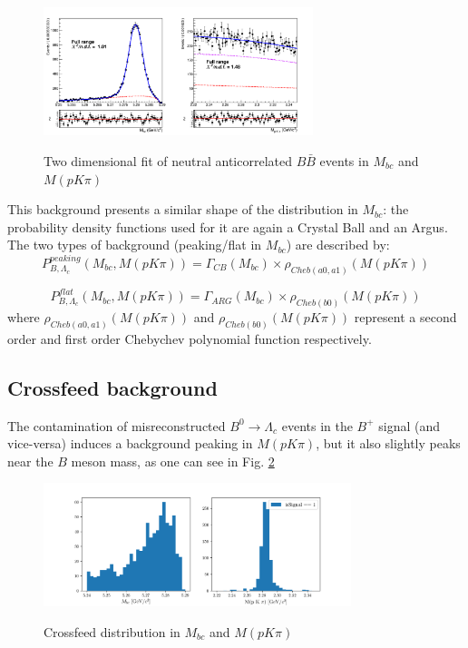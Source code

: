 \begin{figure}
\centering
{\includegraphics[width=0.7\textwidth]{04-SimultaneousFit/figs/stream01235_neutral_anticorrLambdaC_Generic_2DFit.png}}
\caption{Two dimensional fit of neutral anticorrelated $B\bar{B}$  events in $M_{bc}$  and $M(p K \pi)$ }
\label{fig:stream01235_neutral_anticorrLambdaC_Generic_2DFit}
\end{figure}


\newpage
This background presents a 
similar shape of the distribution in $M_{bc}$: the probability
density functions used for it are again a  Crystal Ball and an Argus. \\
The two types of background (peaking/flat in $M_{bc}$) are described by:
\begin{equation}
P^{peaking}_{B,\Lambda_c}(M_{bc}, M(p K \pi)) = \Gamma_{CB}(M_{bc})  \times \rho_{Cheb(a0,a 1)}(M(p K \pi))
\end{equation}

\begin{equation}
P^{flat}_{B,\Lambda_c}(M_{bc}, M(p K \pi)) =  \Gamma_{ARG}(M_{bc}) \times \rho_{Cheb(b0)}(M(p K \pi))
\end{equation}
\newline
where $\rho_{Cheb(a0,a 1)}(M(p K \pi))$ and $\rho_{Cheb(b0)}(M(p K \pi))$  represent a second order and first order Chebychev polynomial function respectively.

\subsection{Crossfeed background}
The contamination of misreconstructed $B^0 \rightarrow \Lambda_c$ events in the $B^+$ signal (and vice-versa) induces a background  peaking in $M(p K \pi)$, but it also slightly peaks near the $B$ meson mass, as one can see in Fig. \ref{fig:chargedBcorr_CrossfeedLambdaCpeak}
\newpage
\begin{figure}
\centering
{\includegraphics[width=0.8\textwidth]{04-SimultaneousFit/figs/chargedBcorr_CrossfeedLambdaCpeak.png}}
\caption{Crossfeed distribution in $M_{bc}$  and $M(p K \pi)$ }
\label{fig:chargedBcorr_CrossfeedLambdaCpeak}
\end{figure}


